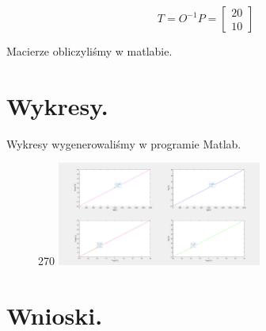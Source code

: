 \documentclass{article}
\begin{document}
$$
T=O^{-1}P=
\begin{bmatrix}
       20 \\
       10
\end{bmatrix}
$$

Macierze obliczyliśmy w matlabie.

\section{Wykresy.}
Wykresy wygenerowaliśmy w programie Matlab.

\begin{figure}
    \centering
    \begin{turn}{270}
    \includegraphics[width=0.6\textwidth]{Dom_wykresy.png}
    \end{turn}
    \label{fig:my_label}
\end{figure}

\section{Wnioski.}
\end{document}
